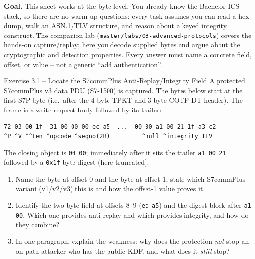 \documentclass[11pt,a4paper]{article}
\begin{document}
\sheetheader

\noindent\textbf{Goal.}
This sheet works at the byte level. You already know the Bachelor ICS
stack, so there are no warm-up questions: every task assumes you can read a
hex dump, walk an ASN.1/TLV structure, and reason about a keyed integrity
construct. The companion lab (\texttt{master/labs/03-advanced-protocols})
covers the hands-on capture/replay; here you decode supplied bytes and argue
about the cryptographic and detection properties. Every answer must name a
concrete field, offset, or value -- not a generic ``add authentication''.

\vspace{0.4em}

\begin{taskbox}{Exercise 3.1 -- Locate the S7commPlus Anti-Replay/Integrity Field}
A protected S7commPlus v3 data PDU (S7-1500) is captured. The bytes below
start at the first S7P byte (i.e.\ after the 4-byte TPKT and 3-byte COTP DT
header). The frame is a write-request body followed by its trailer:
\begin{lstlisting}[language={}]
72 03 00 1f  31 00 00 00 ec a5  ...  00 00 a1 00 21 1f a3 c2
^P ^V ^^Len ^opcode ^seqno(2B)         ^null ^integrity TLV
\end{lstlisting}
The closing object is \texttt{00 00}; immediately after it sits the trailer
\texttt{a1 00 21} followed by a \texttt{0x1f}-byte digest (here truncated).
\begin{enumerate}
  \item Name the byte at offset 0 and the byte at offset 1; state which
        S7commPlus variant (v1/v2/v3) this is and how the offset-1 value
        proves it.
  \item Identify the two-byte field at offsets 8--9 (\texttt{ec a5}) and the
        digest block after \texttt{a1 00}. Which one provides anti-replay and
        which provides integrity, and how do they combine?
  \item In one paragraph, explain the weakness: why does the protection
        \emph{not} stop an on-path attacker who has the public KDF, and what
        does it \emph{still} stop?
\end{enumerate}
\end{taskbox}
\end{document}

